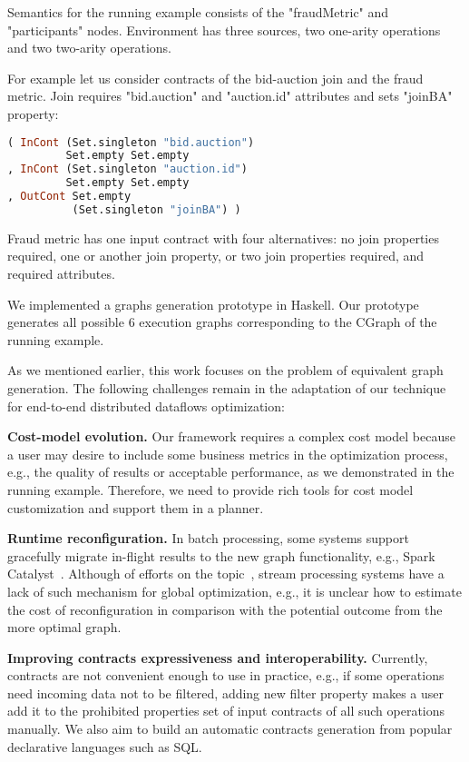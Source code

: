 Semantics for the running example consists of the "fraudMetric" and "participants" nodes.
Environment has three sources, two one-arity operations and two two-arity operations.

For example let us consider contracts of the bid-auction join and the fraud metric.
Join requires "bid.auction" and "auction.id" attributes and sets "joinBA" property:
\begin{lstlisting}[language=Haskell]
( InCont (Set.singleton "bid.auction")
         Set.empty Set.empty
, InCont (Set.singleton "auction.id")
         Set.empty Set.empty
, OutCont Set.empty
          (Set.singleton "joinBA") )
\end{lstlisting}

Fraud metric has one input contract with four alternatives: no join properties required, one or another join property, or two join properties required, and required attributes.

We implemented a graphs generation prototype in Haskell.
Our prototype generates all possible 6 execution graphs corresponding to the CGraph of the running example.

As we mentioned earlier, this work focuses on the problem of equivalent graph generation. The following challenges remain in the adaptation of our technique for end-to-end distributed dataflows optimization:

\textbf{Cost-model evolution.}
Our framework requires a complex cost model because a user may desire to include some business metrics in the optimization process, e.g., the quality of results or acceptable performance, as we demonstrated in the running example. Therefore, we need to provide rich tools for cost model customization and support them in a planner.

\textbf{Runtime reconfiguration.}
In batch processing, some systems support gracefully migrate in-flight results to the new graph functionality, e.g., Spark Catalyst~\cite{armbrust2015spark}. Although of efforts on the topic~\cite{10.14778/3329772.3329777, grulich2020grizzly}, stream processing systems have a lack of such mechanism for global optimization, e.g., it is unclear how to estimate the cost of reconfiguration in comparison with the potential outcome from the more optimal graph.

\textbf{Improving contracts expressiveness and interoperability.}
Currently, contracts are not convenient enough to use in practice, e.g., if some operations need incoming data not to be filtered, adding new filter property makes a user add it to the prohibited properties set of input contracts of all such operations manually. We also aim to build an automatic contracts generation from popular declarative languages such as SQL.